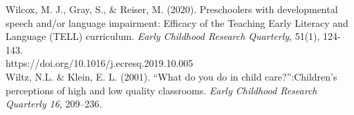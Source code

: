 \documentclass[11.5pt]{sig-alternate}
\begin{document}
Wilcox, M. J., Gray, S., \& Reiser, M. (2020). Preschoolers with developmental speech and/or 
language impairment: Efficacy of the Teaching Early Literacy and Language (TELL) curriculum. \textit{Early Childhood Research Quarterly}, 51(1), 124-143. \\https://doi.org/10.1016/j.ecresq.2019.10.005 
\\

Wiltz,  N.L. \& Klein,  E. L. (2001). “What do you do in child care?”:Children’s perceptions of 
high and low quality classrooms. \textit{Early Childhood Research Quarterly 16}, 209–236.
\end{document}
